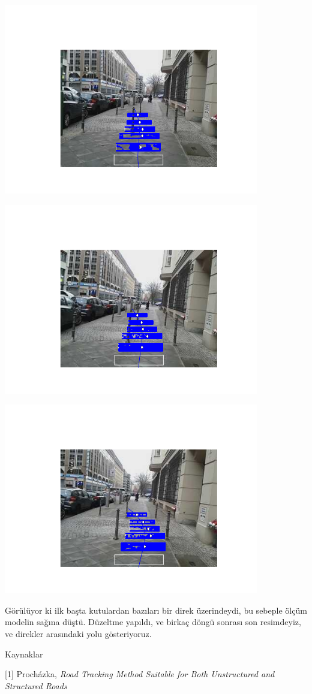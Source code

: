 \documentclass[12pt,fleqn]{article}\usepackage{../../common}
\begin{document}
\includegraphics[width=30em]{out-105.png}

\includegraphics[width=30em]{out-106.png}

\includegraphics[width=30em]{out-107.png}

Görülüyor ki ilk başta kutulardan bazıları bir direk üzerindeydi, bu
sebeple ölçüm modelin sağına düştü. Düzeltme yapıldı, ve birkaç döngü
sonrası son resimdeyiz, ve direkler arasındaki yolu gösteriyoruz. 

Kaynaklar

[1] Procházka, {\em Road Tracking Method Suitable for Both Unstructured and Structured Roads}
\end{document}
